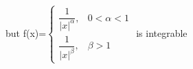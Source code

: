 \documentclass[preview]{standalone}
\begin{document}
\begin{center}
but f(x)=$\begin{cases} \dfrac{1}{|x|^\alpha} , & 0< \alpha <1 \\  \dfrac{1}{|x|^\beta} , & \beta > 1 \end{cases}$ is integrable
\end{center}
\end{document}
